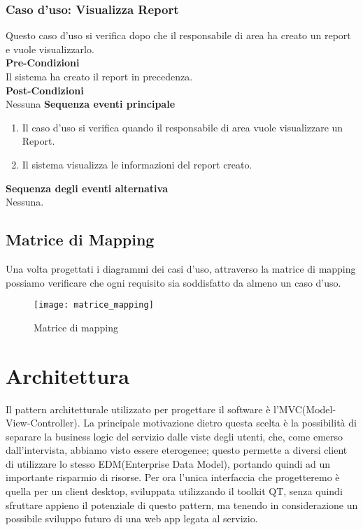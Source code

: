 \documentclass[green, fancy, 11pt]{elegantbook}
\begin{document}
\subsubsection{Caso d'uso: Visualizza Report}

Questo caso d'uso si verifica dopo che il responsabile di area ha creato un report e vuole visualizzarlo.\\
\textbf{Pre-Condizioni}\\
Il sistema ha creato il report in precedenza.\\
\textbf{Post-Condizioni}\\
Nessuna
\textbf{Sequenza eventi principale}
\begin{enumerate}
	\item Il caso d'uso si verifica quando il responsabile di area vuole visualizzare un Report.
	\item Il sistema visualizza le informazioni del report creato.
\end{enumerate}
\textbf{Sequenza degli eventi alternativa}\\
Nessuna.
\newpage

{
\begin{landscape}
\subsection{Matrice di Mapping}
Una volta progettati i diagrammi dei casi d'uso, attraverso la matrice di mapping possiamo verificare che ogni requisito sia soddisfatto da almeno un caso d'uso.
\scriptsize
\begin{figure}[H]
	\centering
	\texttt{[image: matrice\_mapping]}
	\caption{Matrice di mapping}
\end{figure}
\end{landscape}
}

\section{Architettura}

Il pattern architetturale utilizzato per progettare il software è l'MVC(Model-View-Controller). La principale motivazione dietro questa scelta è la possibilità di separare la business logic del servizio dalle viste degli utenti, che, come emerso dall'intervista, abbiamo visto essere eterogenee; questo permette a diversi client di utilizzare lo stesso EDM(Enterprise Data Model), portando quindi ad un importante risparmio
di risorse. Per ora l'unica interfaccia che progetteremo è quella per un client desktop, sviluppata utilizzando il toolkit QT, senza quindi sfruttare appieno il potenziale di questo pattern, ma tenendo in considerazione un possibile sviluppo futuro di una web app legata al servizio.
\end{document}
